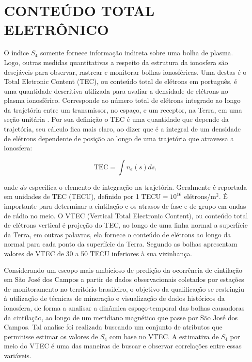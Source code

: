\chapter{CONTEÚDO TOTAL ELETRÔNICO}

O índice $S_4$ somente fornece informação indireta sobre uma bolha de plasma. Logo, outras medidas quantitativas a respeito da estrutura da ionosfera são desejáveis para observar, rastrear e monitorar bolhas ionosféricas. Uma destas é o Total Eletronic Content (TEC), ou conteúdo total de elétrons em português, é uma quantidade descritiva utilizada para avaliar a densidade de elétrons no plasma ionosférico. Corresponde ao número total de elétrons integrado ao longo da trajetória entre um transmissor, no espaço, e um receptor, na Terra, em uma seção unitária \cite{HOFMANN:2013}. Por sua definição o TEC é uma quantidade que depende da trajetória, seu cálculo fica mais claro, ao dizer que é a integral de um densidade de elétrons dependente de posição ao longo de uma trajetória que atravessa a ionosfera:

\begin{equation}
    \mbox{TEC}=\int{n_{e}(s)}ds\mbox{,}~
\end{equation}

onde $ds$ especifica o elemento de integração na trajetória. Geralmente é reportada em unidades de TEC (TECU), definido por 1 TECU$=10^{16}$ elétrons/m$^2$. É importante para determinar a cintilação e os atrasos de fase e de grupo em ondas de rádio no meio. O VTEC (Vertical Total Electronic Content), ou conteúdo total de elétrons vertical é projeção do TEC, ao longo de uma linha normal a superfície da Terra, em outras palavras, ela fornece o conteúdo de elétrons ao longo da normal para cada ponto da superfície da Terra. Segundo \cite{TAKAHASHI:2006} as bolhas apresentam valores de VTEC de 30 a 50 TECU inferiores à sua vizinhança.

Considerando um escopo mais ambicioso de predição da ocorrência de cintilação em São José dos Campos a partir de dados observacionais coletados por estações de monitoramento no território brasileiro, o objetivo da qualificação se restringiu à utilização de técnicas de mineração e visualização de dados históricos da ionosfera, de forma a analisar a dinâmica espaço-temporal das bolhas causadoras da cintilação, ao longo de um meridiano magnético que passe por São José dos Campos. Tal analise foi realizada buscando um conjunto de atributos que permitisse estimar os valores de $S_4$ com base no VTEC. A estimativa de $S_4$ por meio do VTEC é uma das maneiras de buscar e observar correlações entre essas variáveis.

